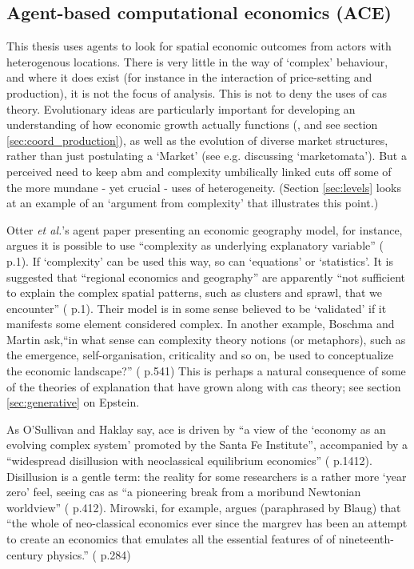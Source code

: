 \subsection{Agent-based computational economics (ACE) \label{sec:ace}}

This thesis uses agents to look for spatial economic outcomes from actors with heterogenous locations. There is very little in the way of `complex' behaviour, and where it does exist (for instance in the interaction of price-setting and production), it is not the focus of analysis. This is not to deny the uses of \gls{cas} theory. Evolutionary ideas are particularly important for developing an understanding of how economic growth actually functions (\citealt{martin_complexity_2007}, and see section \ref{sec:coord_production}), as well as the evolution of diverse market structures, rather than just postulating a `Market' (see e.g. \citealt{mirowski_markets_2007} discussing `marketomata'). But a perceived need to keep \gls{abm} and complexity umbilically linked cuts off some of the more mundane  - yet crucial - uses of heterogeneity. (Section \ref{sec:levels} looks at an example of an `argument from complexity' that illustrates this point.)

Otter \emph{et al.}'s agent paper presenting an economic geography model, for instance, argues it is possible to use ``complexity as underlying explanatory variable'' (\citealt{otter_abloom:_2001} p.1). If `complexity' can be used this way, so can `equations' or `statistics'. It is suggested that ``regional economics and geography'' are apparently ``not sufficient to explain the complex spatial patterns, such as clusters and sprawl, that we encounter'' (\citealt{otter_abloom:_2001} p.1). Their model is in some sense believed to be `validated' if it manifests some element considered complex. In another example, Boschma and Martin ask,``in what sense can complexity theory notions (or metaphors), such as the emergence, self-organisation, criticality and so on, be used to conceptualize the economic landscape?'' (\citealt{boschma_editorial:_2007} p.541) This is perhaps a natural consequence of some of the theories of explanation that have grown along with \gls{cas} theory; see section \ref{sec:generative} on Epstein.

As O'Sullivan and Haklay say, \gls{ace} is driven by ``a view of the `economy as an evolving complex system' promoted by the Santa Fe Institute'', accompanied by a ``widespread disillusion with neoclassical equilibrium economics'' (\citealt{osullivan_agent-based_2000} p.1412). Disillusion is a gentle term: the reality for some researchers is a rather more `year zero' feel, seeing \gls{cas} as ``a pioneering break from a moribund Newtonian worldview'' (\citealt{manson_simplifying_2001} p.412). Mirowski, for example, argues (paraphrased by Blaug) that ``the whole of neo-classical economics ever since the \gls{margrev} has been an attempt to create an economics that emulates all the essential features of of nineteenth-century physics.'' (\citealt{blaug_economic_1997} p.284) 

